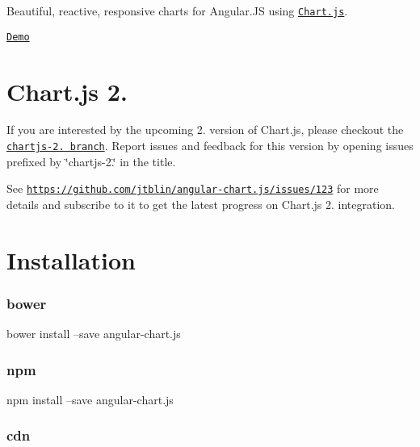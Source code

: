 \href{http://badge.fury.io/bo/angular-chart.js}{\tt } \href{http://badge.fury.io/js/angular-chart.js}{\tt } \href{https://travis-ci.org/jtblin/angular-chart.js}{\tt } \href{https://codeclimate.com/github/jtblin/angular-chart.js}{\tt } \href{https://codeclimate.com/github/jtblin/angular-chart.js}{\tt }

Beautiful, reactive, responsive charts for Angular.\+JS using \href{http://www.chartjs.org/}{\tt Chart.\+js}.

\href{http://jtblin.github.io/angular-chart.js/}{\tt Demo}

\section*{Chart.\+js 2.}

If you are interested by the upcoming 2. version of Chart.\+js, please checkout the \href{https://github.com/jtblin/angular-chart.js/tree/chartjs-2.0}{\tt chartjs-\/2. branch}. Report issues and feedback for this version by opening issues prefixed by \char`\"{}chartjs-\/2.\char`\"{} in the title.

See \href{https://github.com/jtblin/angular-chart.js/issues/123}{\tt https\+://github.\+com/jtblin/angular-\/chart.\+js/issues/123} for more details and subscribe to it to get the latest progress on Chart.\+js 2. integration.

\section*{Installation}

\subsubsection*{bower}

\begin{DoxyVerb}bower install --save angular-chart.js
\end{DoxyVerb}


\subsubsection*{npm}

\begin{DoxyVerb}npm install --save angular-chart.js
\end{DoxyVerb}


\subsubsection*{cdn}

